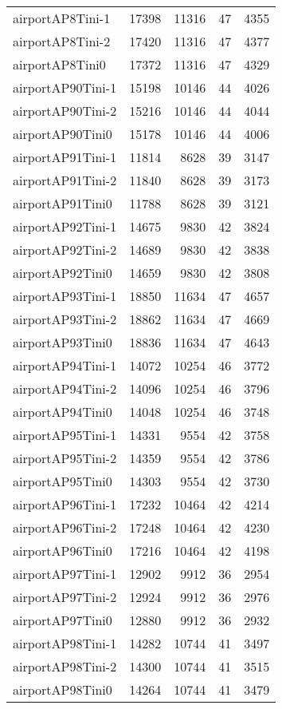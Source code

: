 \begin{tabular}{lrrrr}
airportAP8Tini-1 & 17398 & 11316 & 47 & 4355 \\
airportAP8Tini-2 & 17420 & 11316 & 47 & 4377 \\
airportAP8Tini0 & 17372 & 11316 & 47 & 4329 \\
airportAP90Tini-1 & 15198 & 10146 & 44 & 4026 \\
airportAP90Tini-2 & 15216 & 10146 & 44 & 4044 \\
airportAP90Tini0 & 15178 & 10146 & 44 & 4006 \\
airportAP91Tini-1 & 11814 & 8628 & 39 & 3147 \\
airportAP91Tini-2 & 11840 & 8628 & 39 & 3173 \\
airportAP91Tini0 & 11788 & 8628 & 39 & 3121 \\
airportAP92Tini-1 & 14675 & 9830 & 42 & 3824 \\
airportAP92Tini-2 & 14689 & 9830 & 42 & 3838 \\
airportAP92Tini0 & 14659 & 9830 & 42 & 3808 \\
airportAP93Tini-1 & 18850 & 11634 & 47 & 4657 \\
airportAP93Tini-2 & 18862 & 11634 & 47 & 4669 \\
airportAP93Tini0 & 18836 & 11634 & 47 & 4643 \\
airportAP94Tini-1 & 14072 & 10254 & 46 & 3772 \\
airportAP94Tini-2 & 14096 & 10254 & 46 & 3796 \\
airportAP94Tini0 & 14048 & 10254 & 46 & 3748 \\
airportAP95Tini-1 & 14331 & 9554 & 42 & 3758 \\
airportAP95Tini-2 & 14359 & 9554 & 42 & 3786 \\
airportAP95Tini0 & 14303 & 9554 & 42 & 3730 \\
airportAP96Tini-1 & 17232 & 10464 & 42 & 4214 \\
airportAP96Tini-2 & 17248 & 10464 & 42 & 4230 \\
airportAP96Tini0 & 17216 & 10464 & 42 & 4198 \\
airportAP97Tini-1 & 12902 & 9912 & 36 & 2954 \\
airportAP97Tini-2 & 12924 & 9912 & 36 & 2976 \\
airportAP97Tini0 & 12880 & 9912 & 36 & 2932 \\
airportAP98Tini-1 & 14282 & 10744 & 41 & 3497 \\
airportAP98Tini-2 & 14300 & 10744 & 41 & 3515 \\
airportAP98Tini0 & 14264 & 10744 & 41 & 3479 \\

\end{tabular}
